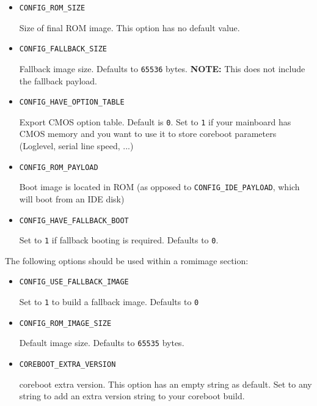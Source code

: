 \documentclass[titlepage,12pt]{article}
\begin{document}
\begin{itemize}
\item \begin{verbatim}CONFIG_ROM_SIZE\end{verbatim}

Size of final ROM image. This option has no default value.

\item \begin{verbatim}CONFIG_FALLBACK_SIZE\end{verbatim}

Fallback image size. Defaults to \texttt{65536} bytes. \textbf{NOTE:} 
This does not include the fallback payload.

\item \begin{verbatim}CONFIG_HAVE_OPTION_TABLE\end{verbatim}

Export CMOS option table. Default is \texttt{0}. Set to \texttt{1} if
your mainboard has CMOS memory and you want to use it to store
coreboot parameters (Loglevel, serial line speed, ...)

\item \begin{verbatim}CONFIG_ROM_PAYLOAD\end{verbatim}

Boot image is located in ROM (as opposed to \texttt{CONFIG\_IDE\_PAYLOAD}, which
will boot from an IDE disk)

\item \begin{verbatim}CONFIG_HAVE_FALLBACK_BOOT\end{verbatim}

Set to \texttt{1} if fallback booting is required. Defaults to
\texttt{0}.

\end{itemize}


The following options should be used within a romimage section:

\begin{itemize}

\item \begin{verbatim}CONFIG_USE_FALLBACK_IMAGE\end{verbatim}

Set to \texttt{1} to build a fallback image. Defaults to \texttt{0}

\item \begin{verbatim}CONFIG_ROM_IMAGE_SIZE\end{verbatim}

Default image size. Defaults to \texttt{65535} bytes.

\item \begin{verbatim}COREBOOT_EXTRA_VERSION\end{verbatim}

coreboot extra version. This option has an empty string as default. Set
to any string to add an extra version string to your coreboot build.

\end{itemize}
\end{document}
